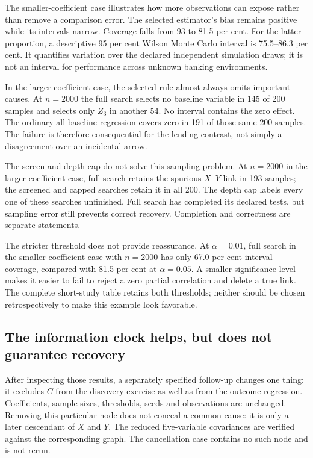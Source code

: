 The smaller-coefficient case illustrates how more observations can expose
rather than remove a comparison error. The selected estimator's bias remains
positive while its intervals narrow. Coverage falls from 93 to 81.5 per cent.
For the latter proportion, a descriptive 95 per cent Wilson Monte Carlo
interval is 75.5--86.3 per cent. It quantifies variation over the declared
independent simulation draws; it is not an interval for performance across
unknown banking environments.

In the larger-coefficient case, the selected rule almost always omits important
causes. At $n=2000$ the full search selects no baseline variable in 145 of 200
samples and selects only $Z_3$ in another 54. No interval contains the zero
effect. The ordinary all-baseline regression covers zero in 191 of those same
200 samples. The failure is therefore consequential for the lending contrast,
not simply a disagreement over an incidental arrow.

The screen and depth cap do not solve this sampling problem. At $n=2000$ in
the larger-coefficient case, full search retains the spurious $X$--$Y$ link in
193 samples; the screened and capped searches retain it in all 200. The depth
cap labels every one of these searches unfinished. Full search has completed
its declared tests, but sampling error still prevents correct recovery.
Completion and correctness are separate statements.

The stricter threshold does not provide reassurance. At $\alpha=0.01$, full
search in the smaller-coefficient case with $n=2000$ has only 67.0 per cent
interval coverage, compared with 81.5 per cent at $\alpha=0.05$. A smaller
significance level makes it easier to fail to reject a zero partial correlation and
delete a true link. The complete short-study table retains both thresholds;
neither should be chosen retrospectively to make this example look favorable.

\subsection{The information clock helps, but does not guarantee recovery}

After inspecting those results, a separately specified follow-up changes one
thing: it excludes $C$ from the discovery exercise as well as from the outcome
regression. Coefficients, sample sizes, thresholds, seeds and observations are
unchanged. Removing this particular node does not conceal a common cause:
it is only a later descendant of $X$ and $Y$. The reduced five-variable
covariances are verified against the corresponding graph. The cancellation
case contains no such node and is not rerun.

